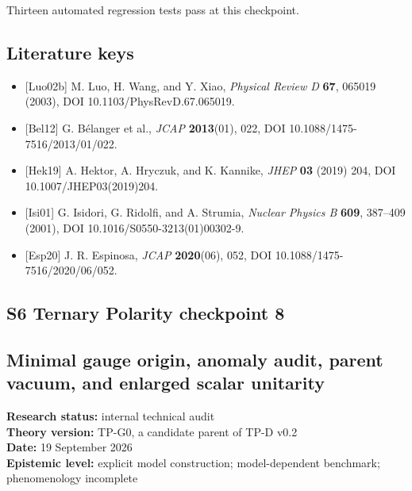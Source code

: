 \documentclass[
]{article}
\providecommand{\tightlist}{%
  \setlength{\itemsep}{0pt}\setlength{\parskip}{0pt}}
\begin{document}
Thirteen automated regression tests pass at this checkpoint.

\hypertarget{literature-keys}{%
\subsection{Literature keys}\label{literature-keys}}

\begin{itemize}
\tightlist
\item
  {[}Luo02b{]} M. Luo, H. Wang, and Y. Xiao, \emph{Physical Review D}
  \textbf{67}, 065019 (2003), DOI 10.1103/PhysRevD.67.065019.
\item
  {[}Bel12{]} G. Bélanger et al., \emph{JCAP} \textbf{2013}(01), 022,
  DOI 10.1088/1475-7516/2013/01/022.
\item
  {[}Hek19{]} A. Hektor, A. Hryczuk, and K. Kannike, \emph{JHEP}
  \textbf{03} (2019) 204, DOI 10.1007/JHEP03(2019)204.
\item
  {[}Isi01{]} G. Isidori, G. Ridolfi, and A. Strumia, \emph{Nuclear
  Physics B} \textbf{609}, 387--409 (2001), DOI
  10.1016/S0550-3213(01)00302-9.
\item
  {[}Esp20{]} J. R. Espinosa, \emph{JCAP} \textbf{2020}(06), 052, DOI
  10.1088/1475-7516/2020/06/052.
\end{itemize}

\newpage

\hypertarget{s6-ternary-polarity-checkpoint-8}{%
\subsection{S6 Ternary Polarity checkpoint
8}\label{s6-ternary-polarity-checkpoint-8}}

\hypertarget{minimal-gauge-origin-anomaly-audit-parent-vacuum-and-enlarged-scalar-unitarity}{%
\subsection{Minimal gauge origin, anomaly audit, parent vacuum, and
enlarged scalar
unitarity}\label{minimal-gauge-origin-anomaly-audit-parent-vacuum-and-enlarged-scalar-unitarity}}

\textbf{Research status:} internal technical audit\\
\textbf{Theory version:} TP-G0, a candidate parent of TP-D v0.2\\
\textbf{Date:} 19 September 2026\\
\textbf{Epistemic level:} explicit model construction; model-dependent
benchmark; phenomenology incomplete
\end{document}

